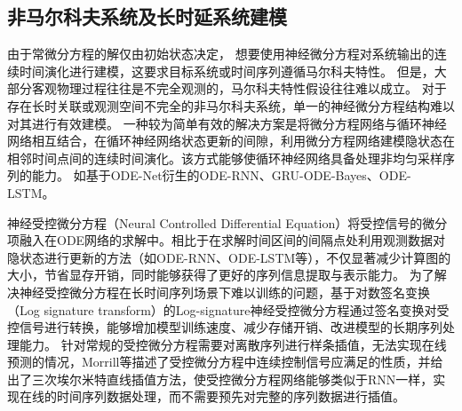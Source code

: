 

\subsection{非马尔科夫系统及长时延系统建模}
由于常微分方程的解仅由初始状态决定，
想要使用神经微分方程对系统输出的连续时间演化进行建模，这要求目标系统或时间序列遵循马尔科夫特性。
但是，大部分客观物理过程往往是不完全观测的，马尔科夫特性假设往往难以成立。
对于存在长时关联或观测空间不完全的非马尔科夫系统，单一的神经微分方程结构难以对其进行有效建模。
一种较为简单有效的解决方案是将微分方程网络与循环神经网络相互结合，在循环神经网络状态更新的间隙，利用微分方程网络建模隐状态在相邻时间点间的连续时间演化。该方式能够使循环神经网络具备处理非均匀采样序列的能力。
如基于ODE-Net衍生的ODE-RNN\cite{10.5555/3454287.3454765}、GRU-ODE-Bayes\cite{brouwer2019gru}、ODE-LSTM\cite{lechner2020learning}。

神经受控微分方程（Neural Controlled Differential Equation）\cite{kidger2020neural}将受控信号的微分项融入在ODE网络的求解中。相比于在求解时间区间的间隔点处利用观测数据对隐状态进行更新的方法（如ODE-RNN、ODE-LSTM等），不仅显著减少计算图的大小，节省显存开销，同时能够获得了更好的序列信息提取与表示能力。
为了解决神经受控微分方程在长时间序列场景下难以训练的问题，基于对数签名变换（Log signature transform）的Log-signature神经受控微分方程\cite{morrill2021neural}通过签名变换对受控信号进行转换，能够增加模型训练速度、减少存储开销、改进模型的长期序列处理能力。
针对常规的受控微分方程需要对离散序列进行样条插值，无法实现在线预测的情况，Morrill等\cite{morrill2021online}描述了受控微分方程中连续控制信号应满足的性质，并给出了三次埃尔米特直线插值方法，使受控微分方程网络能够类似于RNN一样，实现在线的时间序列数据处理，而不需要预先对完整的序列数据进行插值。

